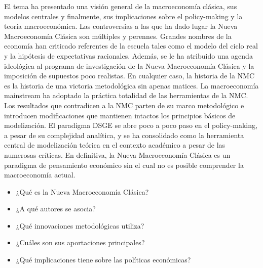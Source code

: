 \documentclass{nuevotema}
\begin{document}
El tema ha presentado una visión general de la macroeconomía clásica, sus modelos centrales y finalmente, sus implicaciones sobre el policy-making y la teoría macroeconómica. Las controversias a las que ha dado lugar la Nueva Macroeconomía Clásica son múltiples y perennes. Grandes nombres de la economía han criticado referentes de la escuela tales como el modelo del ciclo real y la hipótesis de expectativas racionales. Además, se le ha atribuido una agenda ideológica al programa de investigación de la Nueva Macroeconomía Clásica y la imposición de supuestos poco realistas. En cualquier caso, la historia de la NMC es la historia de una victoria metodológica sin apenas matices. La macroeconomía mainstream ha adoptado la práctica totalidad de las herramientas de la NMC. Los resultados que contradicen a la NMC parten de su marco metodológico e introducen modificaciones que mantienen intactos los principios básicos de modelización. El paradigma DSGE se abre poco a poco paso en el policy-making, a pesar de su complejidad analítica, y se ha consolidado como la herramienta central de modelización teórica en el contexto académico a pesar de las numerosas críticas. En definitiva, la Nueva Macroeconomía Clásica es un paradigma de pensamiento económico sin el cual no es posible comprender la macroeconomía actual. 

\begin{itemize}
	\item ¿Qué es la Nueva Macroeconomía Clásica?
	\item ¿A qué autores se asocia?
	\item ¿Qué innovaciones metodológicas utiliza?
	\item ¿Cuáles son sus aportaciones principales?
	\item ¿Qué implicaciones tiene sobre las políticas económicas?
\end{itemize}

\esquemacorto
\end{document}
